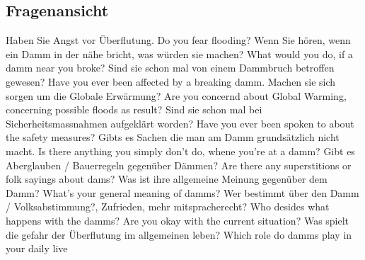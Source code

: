 \subsection{Fragenansicht}
Haben Sie Angst vor Überflutung. \newline
Do you fear flooding?\newline
\newline
Wenn Sie hören, wenn ein Damm in der nähe bricht, was würden sie machen?\newline
What would you do, if a damm near you broke?\newline
\newline
Sind sie schon mal von einem Dammbruch betroffen gewesen?\newline
Have you ever been affected by a breaking damm.\newline
\newline
Machen sie sich sorgen um die Globale Erwärmung?\newline
Are you concernd about Global Warming, concerning possible floods as result?\newline
\newline
Sind sie schon mal bei Sicherheitsmassnahmen aufgeklärt worden?\newline
Have you ever been spoken to about the safety measures? \newline
\newline
Gibts es Sachen die man am Damm grundsätzlich nicht macht.\newline
Is there anything you simply don't do, whene you're at a damm?\newline
\newline
Gibt es Aberglauben / Bauerregeln gegenüber Dämmen?\newline
Are there any superstitions or folk sayings about dams?\newline
\newline
Was ist ihre allgemeine Meinung gegenüber dem Damm?\newline
What's your general meaning of damms?\newline
\newline
Wer bestimmt über den Damm / Volksabstimmung?, Zufrieden, mehr mitspracherecht?\newline
Who desides what happens with the damms?\newline
Are you okay with the current situation?\newline
\newline
Was spielt die gefahr der Überflutung im allgemeinen leben?\newline
Which role do damms play in your daily live\newline


